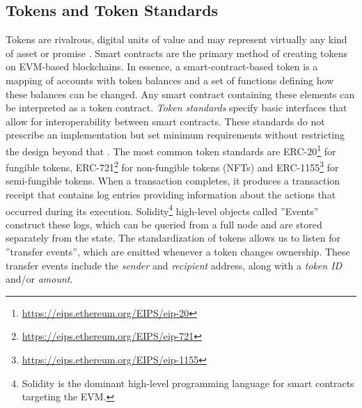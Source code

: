 \documentclass[12pt,a4paper,titlepage,oneside,english]{article}
\begin{document}
\subsection{Tokens and Token Standards}
Tokens are rivalrous, digital units of value \citep{roth2019tokenization} and may represent virtually any kind of asset or promise \citep{Rosenfeld2013}. Smart contracts are the primary method of creating tokens on EVM-based blockchains. In essence, a smart-contract-based token is a mapping of accounts with token balances and a set of functions defining how these balances can be changed. Any smart contract containing these elements can be interpreted as a token contract. \newline
\textit{Token standards} specify basic interfaces that allow for interoperability between smart contracts. These standards do not prescribe an implementation but set minimum requirements without restricting the design beyond that \citep{mastering_ethereum}. 
The most common token standards are ERC-20\footnote{\url{https://eips.ethereum.org/EIPS/eip-20}} for fungible tokens, ERC-721\footnote{\url{https://eips.ethereum.org/EIPS/eip-721}} for non-fungible tokens (NFTs) and ERC-1155\footnote{\url{https://eips.ethereum.org/EIPS/eip-1155}} for semi-fungible tokens.\newline
When a transaction completes, it produces a transaction receipt that contains log entries providing information about the actions that occurred during its execution. Solidity\footnote{Solidity is the dominant high-level programming language for smart contracts targeting the EVM.} high-level objects called ''Events'' construct these logs, which can be queried from a full node and are stored separately from the state. \citep{mastering_ethereum} \newline
The standardization of tokens allows us to listen for ''transfer events'', which are emitted whenever a token changes ownership.
These transfer events include the \textit{sender} and \textit{recipient} address, along with a \textit{token ID} and/or \textit{amount}. 
\end{document}
